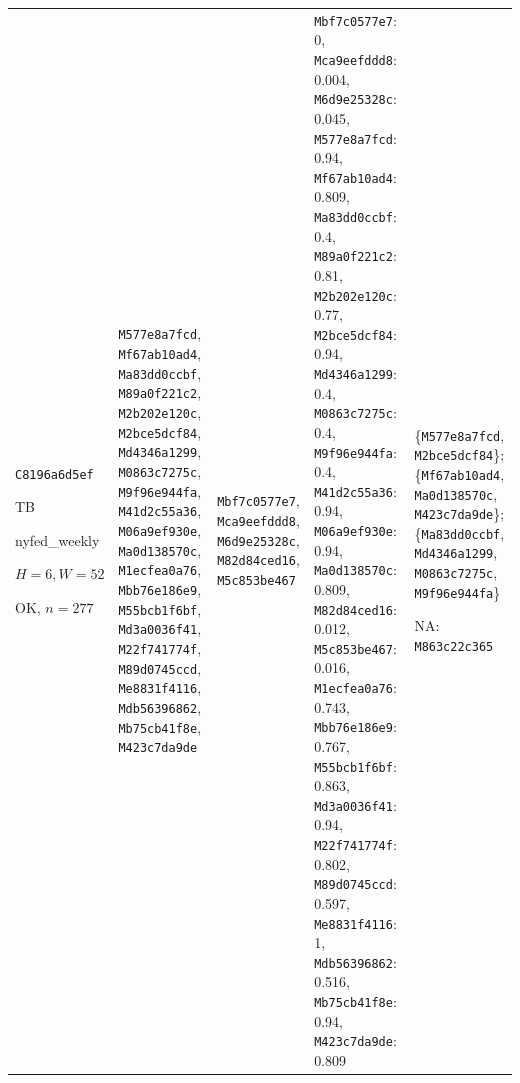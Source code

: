\begin{longtable}{p{.15\linewidth}p{.17\linewidth}p{.17\linewidth}p{.25\linewidth}p{.14\linewidth}}
\texttt{C8196a6d5ef}\par TB\par nyfed\_\allowbreak{}weekly\par $H=6,W=52$\par OK, $n=277$ & \texttt{M577e8a7fcd}, \texttt{Mf67ab10ad4}, \texttt{Ma83dd0ccbf}, \texttt{M89a0f221c2}, \texttt{M2b202e120c}, \texttt{M2bce5dcf84}, \texttt{Md4346a1299}, \texttt{M0863c7275c}, \texttt{M9f96e944fa}, \texttt{M41d2c55a36}, \texttt{M06a9ef930e}, \texttt{Ma0d138570c}, \texttt{M1ecfea0a76}, \texttt{Mbb76e186e9}, \texttt{M55bcb1f6bf}, \texttt{Md3a0036f41}, \texttt{M22f741774f}, \texttt{M89d0745ccd}, \texttt{Me8831f4116}, \texttt{Mdb56396862}, \texttt{Mb75cb41f8e}, \texttt{M423c7da9de} & \texttt{Mbf7c0577e7}, \texttt{Mca9eefddd8}, \texttt{M6d9e25328c}, \texttt{M82d84ced16}, \texttt{M5c853be467} & \texttt{Mbf7c0577e7}: 0, \texttt{Mca9eefddd8}: 0.004, \texttt{M6d9e25328c}: 0.045, \texttt{M577e8a7fcd}: 0.94, \texttt{Mf67ab10ad4}: 0.809, \texttt{Ma83dd0ccbf}: 0.4, \texttt{M89a0f221c2}: 0.81, \texttt{M2b202e120c}: 0.77, \texttt{M2bce5dcf84}: 0.94, \texttt{Md4346a1299}: 0.4, \texttt{M0863c7275c}: 0.4, \texttt{M9f96e944fa}: 0.4, \texttt{M41d2c55a36}: 0.94, \texttt{M06a9ef930e}: 0.94, \texttt{Ma0d138570c}: 0.809, \texttt{M82d84ced16}: 0.012, \texttt{M5c853be467}: 0.016, \texttt{M1ecfea0a76}: 0.743, \texttt{Mbb76e186e9}: 0.767, \texttt{M55bcb1f6bf}: 0.863, \texttt{Md3a0036f41}: 0.94, \texttt{M22f741774f}: 0.802, \texttt{M89d0745ccd}: 0.597, \texttt{Me8831f4116}: 1, \texttt{Mdb56396862}: 0.516, \texttt{Mb75cb41f8e}: 0.94, \texttt{M423c7da9de}: 0.809 & \{\texttt{M577e8a7fcd}, \texttt{M2bce5dcf84}\}; \{\texttt{Mf67ab10ad4}, \texttt{Ma0d138570c}, \texttt{M423c7da9de}\}; \{\texttt{Ma83dd0ccbf}, \texttt{Md4346a1299}, \texttt{M0863c7275c}, \texttt{M9f96e944fa}\}\par NA: \texttt{M863c22c365} \\

\end{longtable}
